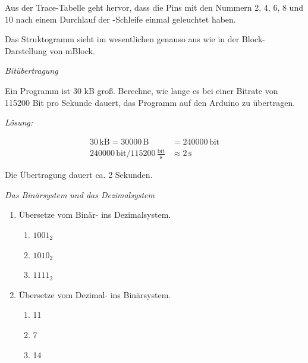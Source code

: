 \documentclass[ngerman, 11pt]{scrreprt}
\begin{document}
	Aus der Trace-Tabelle geht hervor, dass die Pins mit den Nummern 2, 4, 6, 8 und 10 nach einem Durchlauf der -Schleife einmal geleuchtet haben.
	
	Das Struktogramm sieht im wesentlichen genauso aus wie in der Block-Darstellung von mBlock.
	
	\bigskip
	\begin{aufgabe} \emph{Bitübertragung}
		
		Ein Programm ist 30 kB groß. Berechne, wie lange es bei einer Bitrate von 115200 Bit pro Sekunde dauert, das Programm auf den Arduino zu übertragen.
	\end{aufgabe}

	\bigskip
	\emph{Lösung:}
	
	\begin{align*}
		30\,\text{kB} = 30000 \,\text{B} &= 240000 \,\text{bit}\\
		240000 \,\text{bit} / 115200 \,\frac{\text{bit}}{\text{s}} &\approx 2\,\text{s}
	\end{align*}
	
	Die Übertragung dauert ca. 2 Sekunden.
	
	\bigskip
	\begin{aufgabe} \emph{Das Binärsystem und das Dezimalsystem}
		
		\begin{enumerate}[label=\alph*),itemsep=0mm, parsep=0mm]
			\item Übersetze vom Binär- ins Dezimalsystem.
			\begin{multicols}{3}
				\begin{enumerate}[label=(\arabic*)]
					\item $1001_2$
					\item $1010_2$
					\item $1111_2$
				\end{enumerate}
			\end{multicols}
			\item Übersetze vom Dezimal- ins Binärsystem.
			\begin{multicols}{3}
				\begin{enumerate}[label=(\arabic*)]
					\item 11
					\item 7
					\item 14
				\end{enumerate}
			\end{multicols}
		\end{enumerate}
	\end{aufgabe}
	
\end{document}
